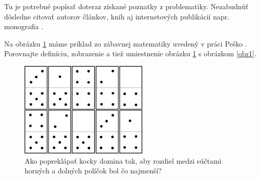Tu je potrebné popísať doteraz získané poznatky z problematiky. 
Nezabudnúť dôsledne citovať autorov článkov, kníh aj internetových publikácií 
napr. monografia \cite{pes2, berman}. 

Na obrázku \ref{obr1a} máme príklad zo zábavnej matematiky uvedený v práci Peško \cite{pes2}.
Porovnajte definíciu, zobrazenie a tiež umiestnenie obrázku \ref{obr1a} s obrázkom \ref{obr1}.

\begin{figure}[ht]
\begin{center}
\includegraphics[width=.5\textwidth]{domino.jpg}
\caption{Ako popreklápať kocky domina tak, aby rozdiel medzi 
súčtami horných a dolných políčok bol čo najmenší? }
\label{obr1a}
\end{center}
\end{figure}

